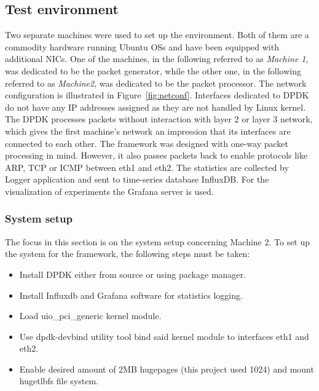 \documentclass[english]{kththesis}
\begin{document}
\subsection{Test environment}

Two separate machines were used to set up the environment. Both of them are a commodity hardware running Ubuntu \glspl{OS} and have been equipped with additional \glspl{NIC}. One of the machines, in the following referred to as \emph{Machine 1}, was dedicated to be the packet generator, while the other one, in the following referred to as \emph{Machine2}, was dedicated to be the packet processor. The network configuration is illustrated in Figure~\ref{fig:netconf}. Interfaces dedicated to \gls{DPDK} do not have any IP addresses assigned as they are not handled by Linux kernel. The \gls{DPDK} processes packets without interaction with layer 2 or layer 3 network, which gives the first machine's network an impression that its interfaces are connected to each other. The framework was designed with one-way packet processing in mind. However, it also passes packets back to enable protocols like ARP, TCP or ICMP between eth1 and eth2. The statistics are collected by Logger application and sent to time-series database InfluxDB. For the visualization of experiments the Grafana server is used. 

\subsubsection{System setup}
The focus in this section is on the system setup concerning Machine 2. To set up the system for the framework, the following steps must be taken:

\begin{itemize}
    \item Install \gls{DPDK} either from source or using package manager.
    \item Install Influxdb and Grafana software for statistics logging.
    \item Load uio\_pci\_generic kernel module.
    \item Use dpdk-devbind utility tool bind said kernel module to interfaces eth1 and eth2.
    \item Enable desired amount of 2MB hugepages (this project used 1024) and mount hugetlbfs file system. 
\end{itemize}
\end{document}
